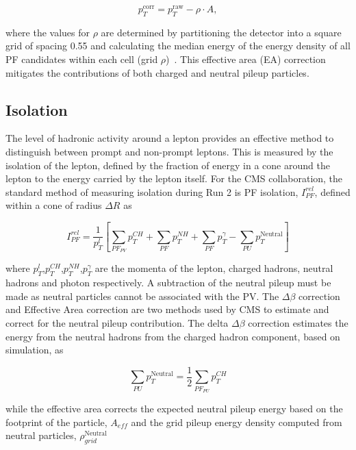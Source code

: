 \begin{equation}
p_T^{\text{corr}} = p_T^{\text{raw}} - \rho \cdot A,
\end{equation}

where the values for $\rho$ are determined by partitioning the detector into a square grid of spacing
0.55 and calculating the median energy of the energy density of all PF candidates within each cell (grid $\rho$)~\cite{fastjet,jet_area}.
This effective area (EA) correction mitigates the contributions of both charged and neutral 
pileup particles.

\subsection{Isolation}

The level of hadronic activity around a lepton provides an effective method to distinguish between prompt and non-prompt leptons.
This is measured by the isolation of the lepton, defined by the fraction of energy
in a cone around the lepton to the energy carried by the lepton itself. For the
CMS collaboration, the standard method of measuring isolation during Run 2 
is PF isolation, $I_{PF}^{rel}$, defined within a cone of radius $\Delta R$ as 

\begin{equation}
I_{PF}^{rel} = \frac{1}{p_T^{l}}\left[ \sum_{PF_{PV}}p_T^{CH} +  \sum_{PF}p_T^{NH} +  \sum_{PF}p_T^{\gamma} -  \sum_{PU}p_T^{\text{Neutral}}\right]
\end{equation}

where $p_T^{l}$,$p_T^{CH}$,$p_T^{NH}$,$p_T^{\gamma}$ are the momenta of the lepton, charged hadrons, neutral hadrons and photon respectively.
A subtraction of the neutral pileup must be made as neutral particles cannot be associated with the PV. The $\Delta \beta$ correction
and Effective Area correction are two methods used by CMS to estimate and correct for the neutral pileup contribution. The delta $\Delta \beta$
correction estimates the energy from the neutral hadrons from the charged hadron component, based on simulation, as

\begin{equation}
\sum_{PU}p_T^{\text{Neutral}} = \frac{1}{2} \sum_{PF_{PU}}p_T^{CH}
\end{equation}

while the effective area corrects the expected neutral pileup energy based on the footprint of the particle, $A_{eff}$ and the grid pileup
energy density computed from neutral particles, $\rho_{grid}^{\text{Neutral}}$

